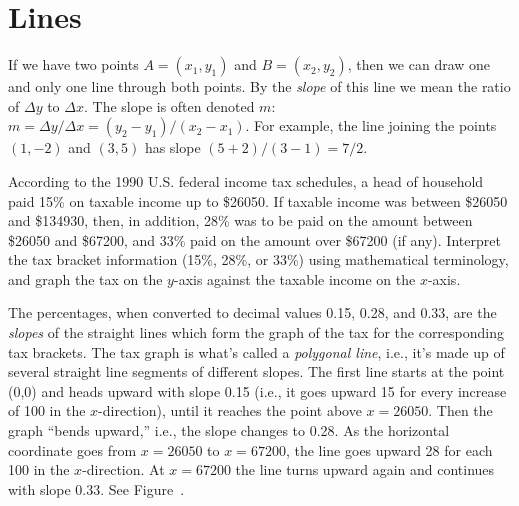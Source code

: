 \section{Lines}{}{}



If we have two points $A=(x_1,y_1)$ and $B=(x_2,y_2)$, then we can draw one
and only one line through both points.  By the {\it slope} of this line
we mean the ratio of $\Delta y$ to $\Delta x$.  The slope is often denoted
$m$: $m=\Delta y/\Delta x=(y_2-y_1)/(x_2-x_1)$.  For example, the line
joining the points $(1,-2)$ and $(3,5)$ has slope
$(5+2)/(3-1)=7/2$.



\begin{example} According to the 1990 U.S. federal income tax schedules, a head
of household paid 15\% on taxable income up to \$26050. If taxable
income was between \$26050 and \$134930, then, in addition, 28\% was to
be paid on the amount between \$26050 and \$67200, and 33\% paid on
the amount over \$67200 (if any).  Interpret the tax bracket
information (15\%, 28\%, or 33\%) using mathematical terminology, and
graph the tax on the $y$-axis against the taxable income on the
$x$-axis.

The percentages, when converted to decimal values 0.15, 0.28, and 0.33,
are the {\it slopes} of the straight lines which form the graph of the
tax for
the corresponding tax brackets.  The tax graph is what's called a
{\it polygonal line}, i.e., it's made up of several straight line segments
of different slopes.  The first line starts at the point (0,0) and heads
upward with slope 0.15 (i.e., it goes upward 15 for every increase of
100 in the $x$-direction), until it reaches the point above $x=26050$.
Then the graph ``bends upward,'' i.e., the slope changes to 0.28.  As
the horizontal coordinate goes from $x=26050$ to $x=67200$, the line
goes upward 28 for each 100 in the $x$-direction.  At $x=67200$ the
line turns upward again and continues with slope 0.33.  See
Figure~.
\end{example}

%

